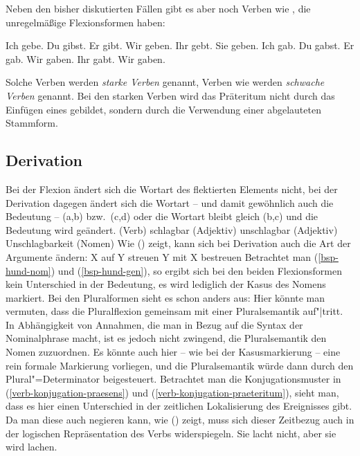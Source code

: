 Neben den bisher diskutierten Fällen gibt es aber noch Verben wie , die unregelmäßige
Flexionsformen haben:
\begin{multicols}{2}
\eal
\ex Ich gebe.   
\ex Du  gibst.  
\ex Er  gibt.   
\ex Wir geben.  
\ex Ihr gebt.   
\ex Sie geben. 
\zl
\eal
\ex Ich gab.
\ex Du  gabst.
\ex Er  gab.
\ex Wir gaben.
\ex Ihr gabt.
\ex Wir gaben. 
\zl
\end{multicols}
\noindent
Solche Verben werden \emph{starke Verben} genannt,
Verben wie  werden \emph{schwache Verben} genannt.
Bei den starken Verben wird das Präteritum nicht durch das Einfügen eines  gebildet,
sondern durch die Verwendung einer abgelauteten Stammform.


\subsection{Derivation}
\label{sec-phen-derivation}

Bei der Flexion ändert sich die Wortart des flektierten Elements nicht, 
bei der Derivation dagegen ändert sich die Wortart -- und damit
gewöhnlich auch die Bedeutung -- (a,b) bzw.\ (c,d) 
oder die Wortart bleibt gleich (b,c) und die Bedeutung wird geändert.
\eal
\ex {} (Verb)
\ex schlagbar (Adjektiv)
\ex unschlagbar (Adjektiv)
\ex Unschlagbarkeit (Nomen)
\zl
Wie () zeigt, kann sich bei Derivation auch die Art der Argumente ändern:
\eal
\ex X auf Y streuen 
\ex Y mit X bestreuen
\zl
Betrachtet man (\ref{bsp-hund-nom}) und (\ref{bsp-hund-gen}), so ergibt sich bei den beiden
Flexionsformen kein Unterschied in der Bedeutung, es wird lediglich der Kasus des Nomens
markiert. Bei den Pluralformen sieht es schon anders aus: Hier könnte man vermuten,
dass die Pluralflexion gemeinsam mit einer Pluralsemantik auf"|tritt. In Abhängigkeit von
Annahmen, die man in Bezug auf die Syntax der Nominalphrase macht, ist es jedoch
nicht zwingend, die Pluralsemantik den Nomen zuzuordnen. Es könnte auch hier -- wie bei der Kasusmarkierung --
eine rein formale Markierung vorliegen, und die Pluralsemantik würde dann durch den Plural"=Determinator beigesteuert.
Betrachtet man die Konjugationsmuster in (\ref{verb-konjugation-praesens}) und (\ref{verb-konjugation-praeteritum}),
sieht man, dass es hier einen Unterschied in der zeitlichen Lokalisierung des Ereignisses gibt.
Da man diese auch negieren kann, wie () zeigt, muss sich dieser Zeitbezug auch in der
logischen Repräsentation des Verbs widerspiegeln.
\ea
Sie lacht nicht, aber sie wird lachen.
\z

